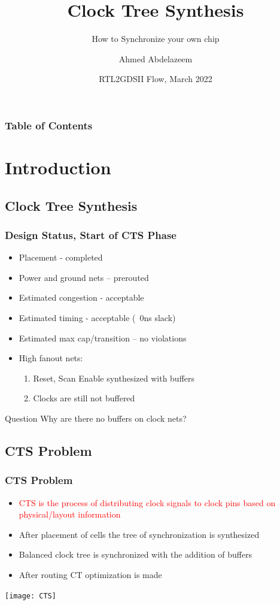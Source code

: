 \documentclass[compress]{beamer}
\title[ASIC Physical Design] %
{Clock Tree Synthesis}
\subtitle{How to Synchronize your own chip}
\author[Ahmed Abdelazeem] %
{Ahmed Abdelazeem}
\institute[ZU] %
{
	Faculty of Engineering\\
	Zagazig University
}
\date[ZU 2023] %
{RTL2GDSII Flow, March 2022}
\begin{document}
	
	\frame{\titlepage}
	
	
	\begin{frame}
		\frametitle{Table of Contents}
		\tableofcontents
	\end{frame}
\section[Intro]{Introduction}
\subsection[CTS]{Clock Tree Synthesis}
\begin{frame}
	\frametitle{Design Status, Start of CTS Phase}
	\begin{itemize}
		\item Placement - completed
		\item Power and ground nets – prerouted
		\item Estimated congestion - acceptable
		\item Estimated timing - acceptable (~0ns slack)
		\item Estimated max cap/transition – no violations
		\item High fanout nets:
			\begin{enumerate}
				\item Reset, Scan Enable synthesized with buffers
				\item Clocks are still not buffered
			\end{enumerate}
	\end{itemize}
\pause
\begin{alertblock}{Question}
Why are there no buffers on clock nets?
\end{alertblock}
\end{frame}	
\subsection[CTS]{CTS Problem}
\begin{frame}
	\frametitle{CTS Problem}
		\begin{itemize}
			\item \textcolor{red}{CTS is the process of distributing clock signals to clock pins based on physical/layout information}
			\item After placement of cells the tree of synchronization is synthesized
			\item Balanced clock tree is synchronized with the addition of buffers
			\item After routing CT optimization is made
		\end{itemize}
		
		\begin{center}
			\texttt{[image: CTS]}
		\end{center}
	
\end{frame}
\end{document}
